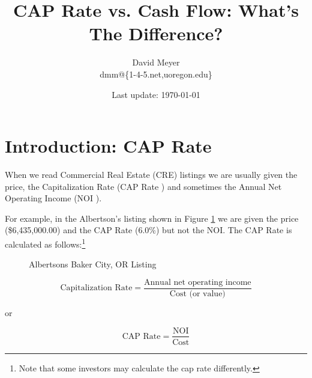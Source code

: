 \documentclass[11pt, oneside]{article}   	%
\title{CAP Rate vs. Cash Flow: What's The Difference?}
\author{David Meyer \\ dmm@\{1-4-5.net,uoregon.edu\}}
\date{Last update: \today}							%
\theoremstyle{definition}
\begin{document}
\maketitle

\section{Introduction: CAP Rate}
When we read Commercial Real Estate (CRE) listings we are usually given the price, the Capitalization Rate (CAP Rate \cite{wiki:cap_rate}) and sometimes 
the Annual Net Operating Income (NOI \cite{wiki:noi}). 

\bigskip
\noindent
For example, in the Albertson's listing shown in Figure \ref{fig:albertsons} we are given the price (\$6,435,000.00) 
and the CAP Rate (6.0\%) but not the NOI. The CAP Rate is calculated as follows:\footnote{Note that some investors may calculate the cap rate differently.}

\bigskip
\begin{figure}[H]
\caption{Albertsons Baker City, OR Listing}
\label{fig:albertsons}
\end{figure}


\begin{equation*}
\text {Capitalization Rate} = \frac {\text{Annual net operating income}} {\text{Cost (or value)}}
\end{equation*}
 
 \bigskip
 \noindent
 or 
 
\begin{equation*}
\text {CAP Rate} = \frac {\text {NOI}} {\text{Cost}}
\end{equation*}
\end{document}

